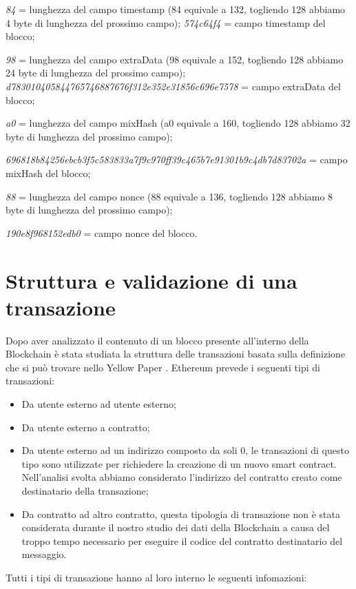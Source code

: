 \documentclass[12pt]{report}
\begin{document}
\textit{84} = lunghezza del campo timestamp (84 equivale a 132, togliendo 128 abbiamo 4 byte di lunghezza del prossimo campo);
\textit{574c64f4} = campo timestamp del blocco;

\textit{98} = lunghezza del campo extraData (98 equivale a 152, togliendo 128 abbiamo 24 byte di lunghezza del prossimo campo);\newline
\textit{d783010405844765746887676f312e352e31856c696e7578} = campo extraData del blocco;

\textit{a0} = lunghezza del campo mixHash (a0 equivale a 160, togliendo 128 abbiamo 32 byte di lunghezza del prossimo campo);

\textit{696818b84256ebcb3f5c583833a7f9c970ff39c465b7e91301b9c4db7d83702a} = campo mixHash del blocco;

\textit{88} = lunghezza del campo nonce (88 equivale a 136, togliendo 128 abbiamo 8 byte di lunghezza del prossimo campo);

\textit{190e8f968152edb0} = campo nonce del blocco.

\newpage
\section{Struttura e validazione di una transazione}

Dopo aver analizzato il contenuto di un blocco presente all'interno della Blockchain è stata studiata la struttura delle transazioni basata sulla definizione che si può trovare nello Yellow Paper \cite{YellowPaper}.
Ethereum prevede i seguenti tipi di transazioni:

\begin{itemize}
    \item Da utente esterno ad utente esterno;
    \item Da utente esterno a contratto;
    \item Da utente esterno ad un indirizzo composto da soli 0, le transazioni di questo tipo sono utilizzate per richiedere la creazione di un nuovo smart contract. Nell'analisi svolta abbiamo considerato l'indirizzo del contratto creato come destinatario della transazione;
    \item Da contratto ad altro contratto, questa tipologia di transazione non è stata considerata durante il nostro studio dei dati della Blockchain a causa del troppo tempo necessario per eseguire il codice del contratto destinatario del messaggio.
\end{itemize}

Tutti i tipi di transazione hanno al loro interno le seguenti infomazioni:
\end{document}
